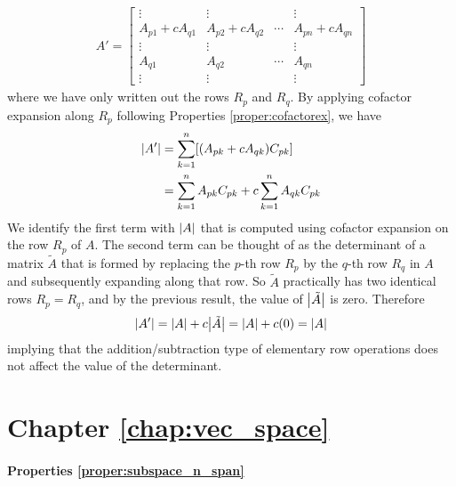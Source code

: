 \begin{align*}
A' = 
\begin{bmatrix}
\vdots & \vdots & & \vdots\\
A_{p1} + cA_{q1} & A_{p2} + cA_{q2} & \cdots & A_{pn} + cA_{qn} \\
\vdots & \vdots & & \vdots\\
A_{q1} & A_{q2} & \cdots & A_{qn} \\
\vdots & \vdots & & \vdots
\end{bmatrix}
\end{align*}
where we have only written out the rows $R_p$ and $R_q$. By applying cofactor expansion along $R_p$ following Properties \ref{proper:cofactorex}, we have
\begin{align}
\abs{A'} &= \sum_{k=1}^{n} [(A_{pk} + cA_{qk}) C_{pk}] \nonumber \\
&= \sum_{k=1}^{n} A_{pk}C_{pk} + c\sum_{k=1}^{n} A_{qk}C_{pk}
\end{align}
We identify the first term with $\abs{A}$ that is computed using cofactor expansion on the row $R_p$ of $A$. The second term can be thought of as the determinant of a matrix $\tilde{A}$ that is formed by replacing the $p$-th row $R_p$ by the $q$-th row $R_q$ in $A$ and subsequently expanding along that row. So $\tilde{A}$ practically has two identical rows $R_p = R_q$, and by the previous result, the value of $\abs{\tilde{A}}$ is zero. Therefore
\begin{align}
\abs{A'} = \abs{A} + c\abs{\tilde{A}} = \abs{A} + c(0) = \abs{A}    
\end{align} implying that the addition/subtraction type of elementary row operations does not affect the value of the determinant.

\section{Chapter \ref*{chap:vec_space}}
\label{section:vecspaceappend}

\paragraph{Properties \ref*{proper:subspace_n_span}}  

